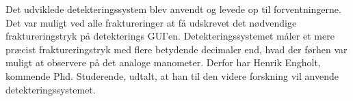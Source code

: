Det udviklede detekteringssystem blev anvendt og levede op til forventningerne. Det var muligt ved alle fraktureringer at få udskrevet det nødvendige fraktureringstryk på detekterings GUI'en. Detekteringssystemet måler et mere præcist fraktureringstryk med flere betydende decimaler end, hvad der førhen var muligt at observere på det analoge manometer. Derfor har Henrik Engholt, kommende Phd. Studerende, udtalt, at han til den videre forskning vil anvende detekteringssystemet. 

















 